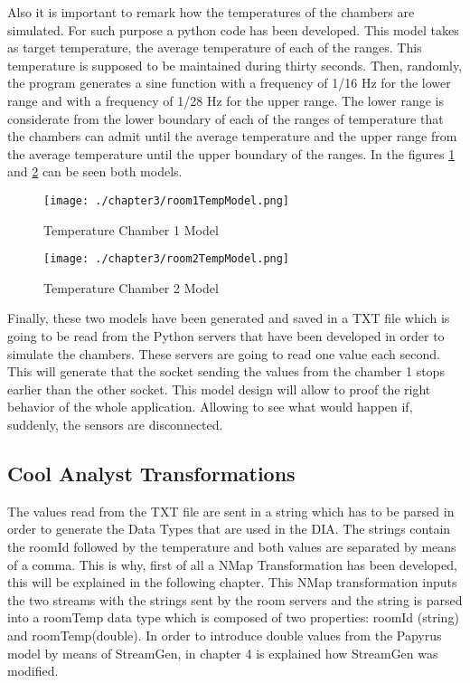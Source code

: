 Also it is important to remark how the temperatures of the chambers are simulated. For such purpose a python code has been developed. This model takes as target temperature, the average temperature of each of the ranges. This temperature is supposed to be maintained during thirty seconds. Then, randomly, the program generates a sine function with a frequency of 1/16 Hz for the lower range and with a frequency of 1/28 Hz for the upper range. The lower range is considerate from the lower boundary of each of the ranges of temperature that the chambers can admit until the average temperature and the upper range from the average temperature until the upper boundary of the ranges. In the figures \ref{fig:Temperature Chamber 1 Model} and \ref{fig:Temperature Chamber 2 Model} can be seen both models.

\begin{figure}
\centering
{\texttt{[image: ./chapter3/room1TempModel.png]}}
\caption{Temperature Chamber 1 Model}
\label{fig:Temperature Chamber 1 Model}
\end{figure}

\begin{figure}
\centering
{\texttt{[image: ./chapter3/room2TempModel.png]}}
\caption{Temperature Chamber 2 Model}
\label{fig:Temperature Chamber 2 Model}
\end{figure}

Finally, these two models have been generated and saved in a TXT file which is going to be read from the Python servers that have been developed in order to simulate the chambers. These servers are going to read one value each second. This will generate that the socket sending the values from the chamber 1 stops earlier than the other socket. This model design will allow to proof the right behavior of the whole application. Allowing to see what would happen if, suddenly, the sensors are disconnected.

\subsection{Cool Analyst Transformations}

The values read from the TXT file are sent in a string which has to be parsed in order to generate the Data Types that are used in the DIA. The strings contain the roomId followed by the temperature and both values are separated by means of a comma. This is why, first of all a NMap Transformation has been developed, this will be explained in the following chapter. This NMap transformation inputs the two streams with the strings sent by the room servers and the string is parsed into a roomTemp data type which is composed of two properties: roomId (string) and roomTemp(double). In order to introduce double values from the Papyrus model by means of StreamGen, in chapter 4 is explained how StreamGen was modified.

